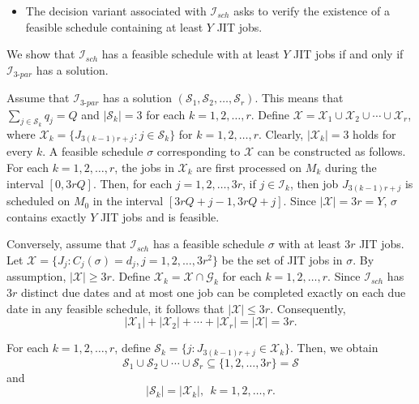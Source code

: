 \documentclass[12pt, eqno, limlimits]{article}
\begin{document}
\begin{sloppypar}
\begin{itemize}
            \item The decision variant associated with $\mathcal{I}_{sch}$ asks to verify the existence of a feasible schedule containing at least $Y$ JIT jobs.	
        \end{itemize}
        
        We show that $\mathcal{I}_{sch}$ has a feasible schedule with at least $Y$ JIT jobs if and only if $\mathcal{I}_{3\text{-}par}$ has a solution.  
        
        Assume that $\mathcal{I}_{3\text{-}par}$ has a solution $(\mathcal{S}_1, \mathcal{S}_2, \ldots, \mathcal{S}_r)$. This means that $\sum_{j \in \mathcal{S}_k} q_j=Q$ and $|\mathcal{S}_k|=3$ for each $k=1, 2, \ldots, r$. Define $\mathcal{X}=\mathcal{X}_1 \cup \mathcal{X}_2 \cup \cdots \cup \mathcal{X}_r$, where $\mathcal{X}_k=\{J_{3(k-1)r+j}: j \in \mathcal{S}_k\}$ for $k=1, 2, \ldots, r$. Clearly, $|\mathcal{X}_k|=3$ holds for every $k$. A feasible schedule $\sigma$ corresponding to $\mathcal{X}$ can be constructed as follows. For each $k=1, 2, \ldots, r$, the jobs in $\mathcal{X}_k$ are first processed on $M_k$ during the interval $[0, 3rQ]$. Then, for each $j=1, 2, \ldots, 3r$, if $j \in \mathcal{I}_k$, then job $J_{3(k-1)r+j}$ is scheduled on $M_0$ in the interval $[3rQ+j-1, 3rQ+j]$. Since $|\mathcal{X}|=3r=Y$, $\sigma$ contains exactly $Y$ JIT jobs and is feasible.
        
        Conversely, assume that $\mathcal{I}_{sch}$ has a feasible schedule $\sigma$ with at least $3r$ JIT jobs.
        Let $\mathcal{X}=\{J_j: C_j(\sigma)=d_j, j=1, 2, \ldots, 3r^2\}$ be the set of JIT jobs in $\sigma$.
        By assumption, $|\mathcal{X}| \geq 3r$. Define $\mathcal{X}_k = \mathcal{X} \cap \mathcal{G}_k$ for each $k=1, 2, \ldots, r$. Since $\mathcal{I}_{sch}$ has $3r$ distinct due dates and at most one job can be completed exactly on each due date in any feasible schedule, it follows that $|\mathcal{X}| \leq 3r$.
        Consequently,
        \begin{equation}\label{E-A.1}
            |\mathcal{X}_1|+|\mathcal{X}_2|+\cdots+|\mathcal{X}_r|=|\mathcal{X}|=3r.
        \end{equation}
        
        For each $k=1, 2, \ldots, r$, define $\mathcal{S}_k=\{j: J_{3(k-1)r+j} \in \mathcal{X}_k\}$.
        Then, we obtain
        \begin{equation}\label{E-A.2}
            \mathcal{S}_1 \cup \mathcal{S}_2 \cup \cdots \cup \mathcal{S}_r \subseteq \{1, 2, \ldots, 3r\}=\mathcal{S}
        \end{equation}
        and
        \begin{equation}\label{E-A.3}
            |\mathcal{S}_k| = |\mathcal{X}_k|, ~~ k=1, 2, \ldots, r.
        \end{equation}
        

\end{sloppypar}
\end{document}
